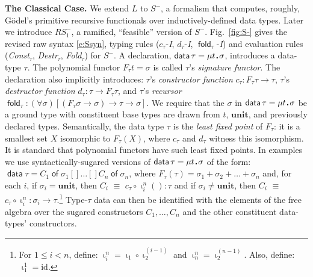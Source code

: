 \documentclass[envcountsame]{llncs}
\newcommand{\key}[1]{\ensuremath{\mathop{\mathsf{#1}}\nolimits}\xspace}
\newcommand{\Of}{\key{of}}
\newcommand{\fold}{\key{fold}}
\newcommand{\Unit}{\ensuremath{\mathbf{unit}}\xspace}
\newcommand{\alt}{\mathrel{[\!]}}
\newcommand{\constr}[1]{\ensuremath{\mathop{\mathsf{#1}}\nolimits}\xspace}
\newcommand{\data}{\constr{data}}
\newcommand{\id}{\mathrm{id}}
\newcommand{\lfp}[1]{\mu #1\,\sqdot\,}
\newcommand{\inj}{\mathop{\iota}\nolimits}
\newcommand{\RSmi}{\mathit{RS^-_1}}
\newcommand{\sqdot}{\rule{0.5mm}{0.5mm}}
\newcommand{\of}{\colon}
\renewcommand{\colon}{\mathpunct{:}}
\begin{document}
\textbf{The Classical Case.} \enspace
We extend $L$ to $S^-$, a formalism that computes,
roughly, G\"{o}del's primitive recursive functionals
\cite{Longley:notions:1} over inductively-defined data
types.  Later we  introduce $\RSmi$, a ramified, ``feasible''
version of $S^-$.  Fig.~\ref{fig:S-} gives the revised raw syntax
\eqref{e:Ssyn}, typing rules ($c_\tau$-\emph{I},
$d_\tau$-\emph{I}, $\fold_\tau$-\emph{I}) and evaluation rules
(\emph{Const}$_\tau$, \emph{Destr}$_\tau$,  \emph{Fold}$_\tau$)
for $S^-$.  A declaration, $\data \tau = \lfp{t}\sigma$, introduces
a data-type $\tau$.
The polynomial functor $F_\tau t = \sigma$ is called $\tau$'s
\emph{signature functor}.  The declaration also implicitly
introduces: $\tau$'s \emph{constructor function} 
        $c_\tau\of F_\tau\tau\to\tau$,  
$\tau$'s \emph{destructor  function}  
        $d_\tau\of \tau \to F_\tau \tau$,
        and
$\tau$'s \emph{recursor} $\fold_\tau \of (\forall
        \sigma)[(F_\tau\sigma \to \sigma) \to \tau \to \sigma]$.
We require that the $\sigma$ in $\data \tau = \lfp{t}\sigma$ be a
ground type with constituent base types are drawn from $t$, $\Unit$,
and previously declared types.  Semantically, the data type $\tau$
is the \emph{least fixed point} of $F_\tau$: it is a
smallest set $X$ isomorphic to $F_\tau(X)$, where $c_\tau$ and
$d_\tau$ witness this isomorphism.
It is standard that polynomial functors have 
such least fixed points.
In examples we use syntactically-sugared versions of $\data \tau =
\lfp{t}\sigma$ of the form:
$\data \tau = C_1 \Of \sigma_1 \alt \dots \alt C_n \Of \sigma_n$,
where $F_\tau(\tau) = \sigma_1+\sigma_2+\dots+\sigma_n$ and, for each $i$, 
if $\sigma_i=\Unit$, 
   then $C_i$ $\equiv$ $c_\tau\circ\inj_i^n() : \tau$ and 
if $\sigma_i\not=\Unit$, 
   then $C_i$ $\equiv$
   $c_\tau\circ\inj_i^n : \sigma_i\to\tau$.\footnote{For $1\leq i < n$, define: 
  $\inj_i^n = \inj_1\circ \inj_2^{(i-1)}$ and
  $\inj_n^n = \inj_2^{(n-1)}$.
  Also, define: $\inj_1^1 = \id$.   
}   
Type-$\tau$ data can then be identified with the elements of the
free algebra over the sugared constructors $C_1,\dots,C_n$ and the
other constituent data-types' constructors.
\end{document}

